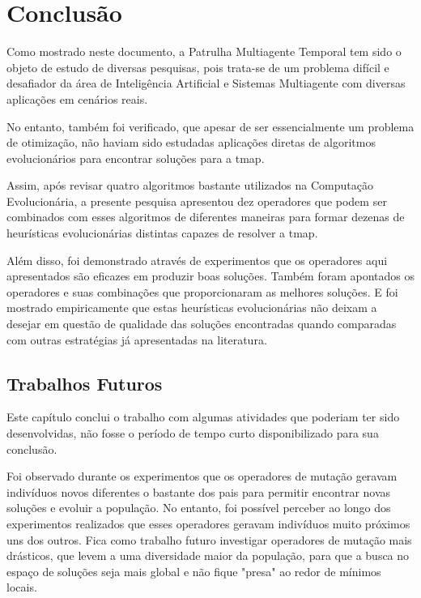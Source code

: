 \chapter{Conclusão}

Como mostrado neste documento, a Patrulha Multiagente Temporal tem sido o objeto 
de estudo de diversas pesquisas, pois trata-se de um problema difícil e 
desafiador da área de Inteligência Artificial e Sistemas Multiagente com 
diversas aplicações em cenários reais.

No entanto, também foi verificado, que apesar de ser essencialmente um problema 
de otimização, não haviam sido estudadas aplicações diretas de algoritmos 
evolucionários para encontrar soluções para a \ac{tmap}.

Assim, após revisar quatro algoritmos bastante utilizados na Computação 
Evolucionária, a presente pesquisa apresentou dez operadores que podem ser 
combinados com esses algoritmos de diferentes maneiras para formar dezenas de 
heurísticas evolucionárias distintas capazes de resolver a \ac{tmap}.

Além disso, foi demonstrado através de experimentos que os operadores aqui 
apresentados são eficazes em produzir boas soluções. Também foram apontados 
os operadores e suas combinações que proporcionaram as melhores soluções. 
E foi mostrado empiricamente que estas heurísticas evolucionárias não deixam 
a desejar em questão de qualidade das soluções encontradas quando comparadas 
com outras estratégias já apresentadas na literatura.

\section{Trabalhos Futuros}

Este capítulo conclui o trabalho com algumas atividades que poderiam ter sido 
desenvolvidas, não fosse o período de tempo curto disponibilizado para sua 
conclusão.

Foi observado durante os experimentos que os operadores de mutação geravam 
indivíduos novos diferentes o bastante dos pais para permitir encontrar novas 
soluções e evoluir a população. No entanto, foi possível perceber ao longo dos 
experimentos realizados que esses operadores geravam indivíduos muito próximos 
uns dos outros. Fica como trabalho futuro investigar operadores de mutação mais 
drásticos, que levem a uma diversidade maior da população, para que a busca no 
espaço de soluções seja mais global e não fique "presa" ao redor de mínimos 
locais.


